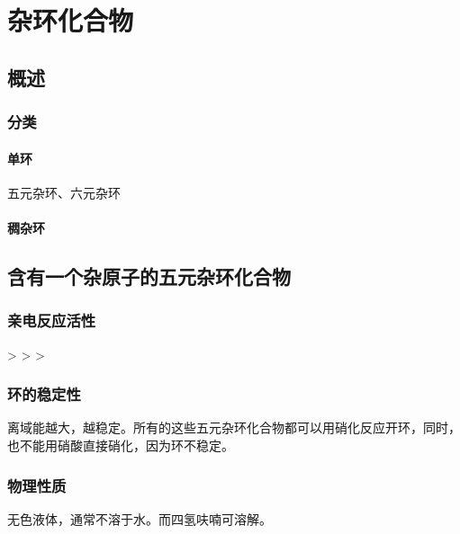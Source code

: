 \chapter{杂环化合物}
\section{概述}
\subsection{分类}
\subsubsection{单环}
五元杂环、六元杂环
\subsubsection{稠杂环}
\section{含有一个杂原子的五元杂环化合物}

\begin{center}
\end{center}

\subsection{亲电反应活性}

\begin{center}
     >   >  > 
\end{center}

\subsection{环的稳定性}

离域能越大，越稳定。所有的这些五元杂环化合物都可以用硝化反应开环，同时，也不能用硝酸直接硝化，因为环不稳定。


\subsection{物理性质}

无色液体，通常不溶于水。而四氢呋喃可溶解。

